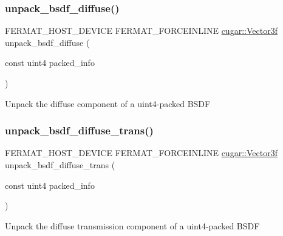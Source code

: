 \subsubsection{\texorpdfstring{unpack\+\_\+bsdf\+\_\+diffuse()}{unpack\_bsdf\_diffuse()}}
{\footnotesize\ttfamily F\+E\+R\+M\+A\+T\+\_\+\+H\+O\+S\+T\+\_\+\+D\+E\+V\+I\+CE F\+E\+R\+M\+A\+T\+\_\+\+F\+O\+R\+C\+E\+I\+N\+L\+I\+NE \hyperlink{structcugar_1_1_vector}{cugar\+::\+Vector3f} unpack\+\_\+bsdf\+\_\+diffuse (\begin{DoxyParamCaption}\item[{const uint4}]{packed\+\_\+info }\end{DoxyParamCaption})}

\begin{DoxyParagraph}{}
Unpack the diffuse component of a uint4-\/packed B\+S\+DF 
\end{DoxyParagraph}
\mbox{\label{group___b_p_t_lib_core_ga6622eb324770dae8cd60dc5b6def876a}} 
\subsubsection{\texorpdfstring{unpack\+\_\+bsdf\+\_\+diffuse\+\_\+trans()}{unpack\_bsdf\_diffuse\_trans()}}
{\footnotesize\ttfamily F\+E\+R\+M\+A\+T\+\_\+\+H\+O\+S\+T\+\_\+\+D\+E\+V\+I\+CE F\+E\+R\+M\+A\+T\+\_\+\+F\+O\+R\+C\+E\+I\+N\+L\+I\+NE \hyperlink{structcugar_1_1_vector}{cugar\+::\+Vector3f} unpack\+\_\+bsdf\+\_\+diffuse\+\_\+trans (\begin{DoxyParamCaption}\item[{const uint4}]{packed\+\_\+info }\end{DoxyParamCaption})}

\begin{DoxyParagraph}{}
Unpack the diffuse transmission component of a uint4-\/packed B\+S\+DF 
\end{DoxyParagraph}
\mbox{\label{group___b_p_t_lib_core_ga51ab08450720cf29963a5ea1ba68f600}} 
